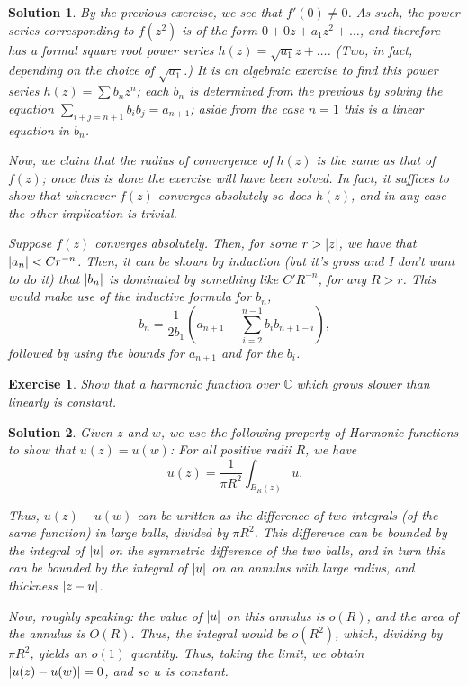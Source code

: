 \documentclass{article}
\newtheorem{ex}{Exercise}
\theoremstyle{nonumberplain}
\newtheorem{sol}{Solution}
\newcommand{\C}{\mathbb{C}}
\DeclarePairedDelimiter{\abs}{\lvert}{\rvert}
\begin{document}
\begin{sol}
By the previous exercise, we see that $f'(0) \neq 0$. As such, the power series corresponding to $f(z^2)$ is of the form $0 + 0 z + a_1 z^2 + \dots$, and therefore has a formal square root power series $h(z) = \sqrt{a_1} z + \dots$. (Two, in fact, depending on the choice of $\sqrt{a_1}$.) It is an algebraic exercise to find this power series $h(z) = \sum b_n z^n$; each $b_n$ is determined from the previous by solving the equation $\sum_{i+j = n+1} b_i b_j = a_{n+1} $; aside from the case $n = 1$ this is a linear equation in $b_n$.

Now, we claim that the radius of convergence of $h(z)$ is the same as that of $f(z)$; once this is done the exercise will have been solved. In fact, it suffices to show that whenever $f(z)$ converges absolutely so does $h(z)$, and in any case the other implication is trivial.

Suppose $f(z)$ converges absolutely. Then, for some $r > \abs z$, we have that $\abs{a_n} < C r^{-n}$. Then, it can be shown by induction (but it's gross and I don't want to do it) that $\abs{b_n}$ is dominated by something like $C' R^{-n}$, for any $R > r$. This would make use of the inductive formula for $b_n$,
\begin{equation}
b_n = \frac1{2 b_1} \left( a_{n+1} - \sum_{i=2}^{n-1} b_i b_{n+1-i} \right),
\end{equation}
followed by using the bounds for $a_{n+1}$ and for the $b_i$.
\end{sol}

\begin{ex}
Show that a harmonic function over $\C$ which grows slower than linearly is constant.
\end{ex}

\begin{sol}
Given $z$ and $w$, we use the following property of Harmonic functions to show that $u(z) = u(w)$: For all positive radii $R$, we have
\begin{equation}
u(z) = \frac1{\pi R^2} \int_{B_R(z)} u.
\end{equation}

Thus, $u(z) - u(w)$ can be written as the difference of two integrals (of the same function) in large balls, divided by $\pi R^2$. This difference can be bounded by the integral of $\abs u$ on the symmetric difference of the two balls, and in turn this can be bounded by the integral of $\abs u$ on an annulus with large radius, and thickness $\abs{z-u}$.

Now, roughly speaking: the value of $\abs u$ on this annulus is $o(R)$, and the area of the annulus is $O(R)$. Thus, the integral would be $o(R^2)$, which, dividing by $\pi R^2$, yields an $o(1)$ quantity. Thus, taking the limit, we obtain $\abs{u(z) - u(w)} = 0$, and so $u$ is constant.
\end{sol}
\end{document}

